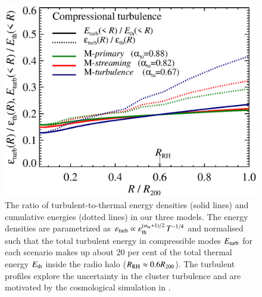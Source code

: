 \documentclass[fleqn,usenatbib,useAMS]{mnras}
\newcommand{\eps}{\varepsilon}
\begin{document}
\begin{figure}
  \includegraphics[width=1.0\columnwidth]{turb_profile_ratio_tot.eps}
  \caption{The ratio of turbulent-to-thermal energy densities (solid
    lines) and cumulative energies (dotted lines) in our three
    models. The energy densities are parametrized as
    $\eps_\rmn{turb} \propto
    \eps_\rmn{th}^{(\alpha_{\rmn{tu}}+1)/2}\,T^{-1/4}$ and
    normalised such that the total turbulent energy in compressible
    modes $E_{\mathrm{turb}}$ for each scenario makes up about 20 per cent of the
    total thermal energy $E_{\mathrm{th}}$ inside the radio halo
    ($R_{\mathrm{RH}}\approx0.6R_{200}$). The turbulent profiles explore
    the uncertainty in the cluster turbulence and are motivated by the
    cosmological simulation in
    \citep{2009ApJ...705.1129L,2010ApJ...725.1452S,2011A&A...529A..17V}.}
  \label{fig:turb}
\end{figure}
\end{document}
